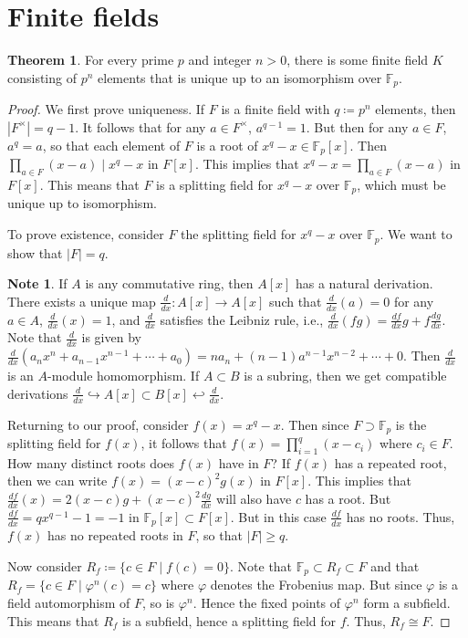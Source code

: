 \documentclass[10pt,letterpaper,cm]{nupset}
\theoremstyle{definition}
\newtheorem{note}[definition]{Note}
\theoremstyle{theorem}
\newtheorem{theorem}[definition]{Theorem}
\theoremstyle{remark}
\newcommand{\F}{\mathbb F}
\newcommand{\1}{\mathbf{1}}
\newcommand{\0}{\vec 0}
\begin{document}
\section{Finite fields}

\begin{theorem}
For every prime $p$ and integer $n>0$, there is some finite field $K$ consisting of $p^n$ elements that is unique up to an isomorphism over $\F_p$.
\end{theorem}
\begin{proof}
We first prove uniqueness. If $F$ is a finite field with $q\coloneqq p^n$ elements, then $\left\lvert{F^{\times}}\right\rvert = q-1$. It follows that for any $a \in F^{\times}$,  $a^{q-1} =1$. But then for any $a \in F$, $a^q = a$, so that each element of $F$ is a root of $x^q -x \in \F_p[x]$. Then $\prod_{a\in F}(x-a) \mid x^q -x$ in $F[x]$. This implies that $x^q -x = \prod_{a\in F}(x-a)$ in $F[x]$. This means that $F$ is a splitting field for $x^q-x$ over $\F_p$, which must be unique up to isomorphism.

\smallskip

 To prove existence, consider $F$ the splitting field for $x^q -x$ over $\F_p$. We want to show that $\left\lvert{F}\right\rvert =q$. 
 
\begin{note}
If $A$ is any commutative ring, then $A[x]$ has a natural derivation. There exists a unique map $\frac{d}{dx} : A[x] \to A[x]$ such that $\frac{d}{dx}(a) = 0$ for any $a\in A$, $\frac{d}{dx}(x) =1$, and $\frac{d}{dx}$ satisfies the Leibniz rule, i.e., $\frac{d}{dx}(fg) = \frac{df}{dx}g + f\frac{dg}{dx}$. Note that $\frac{d}{dx}$ is given by $\frac{d}{dx}(a_nx^n  + a_{n-1}x^{n-1} + \cdots + a_0) = na_n + (n-1)a^{n-1}x^{n-2} + \cdots + 0$. Then $\frac{d}{dx}$ is an $A$-module homomorphism. If $A \subset B$ is a subring, then we get compatible derivations $\frac{d}{dx} \hookrightarrow A[x] \subset B[x] \hookleftarrow \frac{d}{dx}$. 
\end{note}

Returning to our proof, consider $f(x) = x^q -x$. Then since $F \supset \F_p$ is the splitting field for $f(x)$, it follows that $f(x) = \prod_{i=1}^q (x-c_i)$ where $c_i \in F$. How many distinct roots does $f(x)$ have in $F$? If $f(x)$ has a repeated root, then we can write $f(x) = (x-c)^2g(x)$ in $F[x]$. This implies that $\frac{df}{dx}(x) = 2(x-c)g + (x-c)^2 \frac{dg}{dx}$ will also have $c$ has a root. But $\frac{df}{dx} = qx^{q-1} -1 = {-1}$ in $\F_p[x]\subset F[x]$. But in this case $\frac{df}{dx}$ has no roots. Thus, $f(x)$ has no repeated roots in $F$, so that $\left\lvert{F}\right\rvert \geq q$.

Now consider $R_f\coloneqq  \{c \in F \mid f(c) = 0\}$. Note that $\F_p \subset R_f \subset F$ and that  $R_f = \{c\in F \mid \varphi^n(c) = c\}$ where $\varphi$ denotes the Frobenius map. But since $\varphi$ is a field automorphism of $F$, so is $\varphi^n$. Hence the fixed points of $\varphi^n$ form a subfield. This means that $R_f$ is a subfield, hence a splitting field for $f$. Thus, $R_f \cong F$. 
\end{proof}
\end{document}

